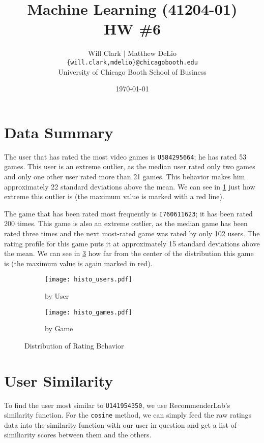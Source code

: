 



\title{Machine Learning (41204-01)\\HW \#6}
\author{Will Clark $\vert$ Matthew DeLio \\
\texttt{\{will.clark,mdelio\}@chicagobooth.edu} \\
University of Chicago Booth School of Business}
\date{\today}
\maketitle

\section{Data Summary}

The user that has rated the most video games is \texttt{U584295664}; he has rated 53 games. This user is an extreme outlier, as the median user rated only two games and only one other user rated more than 21 games. This behavior makes him approximately 22 standard deviations above the mean. We can see in \cref{fig:histo_users} just how extreme this outlier is (the maximum value is marked with a red line).

The game that has been rated most frequently is \texttt{I760611623}; it has been rated 200 times. This game is also an extreme outlier, as the median game has been rated three times and the next most-rated game was rated by only 102 users. The rating profile for this game puts it at approximately 15 standard deviations above the mean. We can see in \cref{fig:histo_games} how far from the center of the distribution this game is (the maximum value is again marked in red).

\begin{figure}
\centering
\begin{subfigure}[b]{0.49\textwidth}
\caption{by User}
\texttt{[image: histo\_users.pdf]}
\label{fig:histo_users}
\end{subfigure}
\hfill
\begin{subfigure}[b]{0.49\textwidth}
\caption{by Game}
\texttt{[image: histo\_games.pdf]}
\label{fig:histo_games}
\end{subfigure}
\caption{Distribution of Rating Behavior}
\end{figure}

\section{User Similarity}
To find the user most similar to \texttt{U141954350}, we use RecommenderLab's similarity function.  For the \texttt{cosine} method, we can simply feed the raw ratings data into the similarity function with our user in question and get a list of similiarity scores between them and the others.

